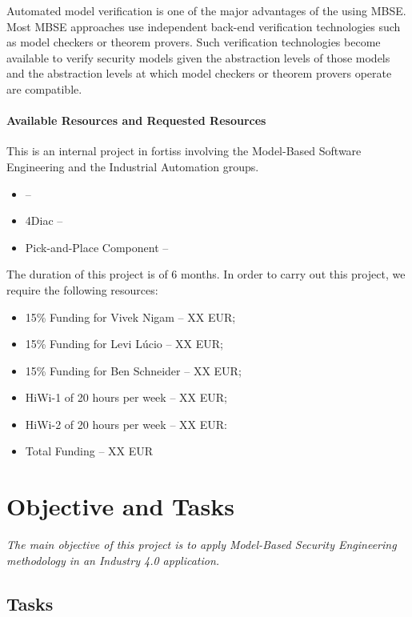 Automated model verification is one of the major advantages of the using MBSE.
Most MBSE approaches use independent back-end verification technologies such as
model checkers or theorem provers. Such verification technologies become available to
verify security models given the abstraction levels of those models and the
abstraction levels at which model checkers or theorem provers operate are
compatible.

\paragraph{Available Resources and Requested Resources} 
This is an internal project in fortiss involving the Model-Based Software Engineering and the Industrial Automation groups. 
\begin{itemize}
  \item \autofocus -- 
  \item 4Diac -- 
  \item Pick-and-Place Component --
\end{itemize}
  
The duration of this project is of 6 months. In order to carry out this project, we require the following resources:

\begin{itemize}
  \item 15\% Funding for Vivek Nigam -- XX EUR;
  \item 15\% Funding for Levi L\'ucio -- XX EUR;
  \item 15\% Funding for Ben Schneider -- XX EUR;
  \item HiWi-1 of 20 hours per week -- XX EUR;
  \item HiWi-2 of 20 hours per week -- XX EUR:
  \item Total Funding -- XX EUR
\end{itemize}

\section{Objective and Tasks}

\begin{center}
  \emph{The main objective of this project is to apply Model-Based Security Engineering methodology in an Industry 4.0 application.}
\end{center}

\subsection{Tasks}

